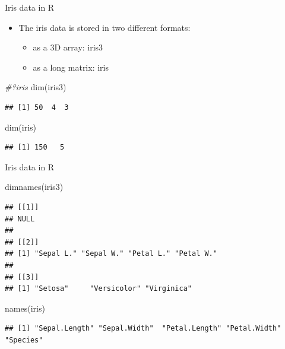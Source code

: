 \documentclass[
  ignorenonframetext,
]{beamer}
\newenvironment{Shaded}{\begin{snugshade}}{\end{snugshade}}
\newcommand{\CommentTok}[1]{\textcolor[rgb]{0.56,0.35,0.01}{\textit{#1}}}
\newcommand{\FunctionTok}[1]{\textcolor[rgb]{0.00,0.00,0.00}{#1}}
\newcommand{\NormalTok}[1]{#1}
\providecommand{\tightlist}{%
  \setlength{\itemsep}{0pt}\setlength{\parskip}{0pt}}
\begin{document}
\begin{frame}[fragile]{Iris data in R}
\protect\hypertarget{iris-data-in-r}{}
\begin{itemize}
\tightlist
\item
  The iris data is stored in two different formats:

  \begin{itemize}
  \tightlist
  \item
    as a 3D array: iris3
  \item
    as a long matrix: iris
  \end{itemize}
\end{itemize}

\begin{Shaded}
\begin{Highlighting}[]
\CommentTok{\#?iris}
\FunctionTok{dim}\NormalTok{(iris3)}
\end{Highlighting}
\end{Shaded}

\begin{verbatim}
## [1] 50  4  3
\end{verbatim}

\begin{Shaded}
\begin{Highlighting}[]
\FunctionTok{dim}\NormalTok{(iris)}
\end{Highlighting}
\end{Shaded}

\begin{verbatim}
## [1] 150   5
\end{verbatim}
\end{frame}

\begin{frame}[fragile]{Iris data in R}
\protect\hypertarget{iris-data-in-r-1}{}
\begin{Shaded}
\begin{Highlighting}[]
\FunctionTok{dimnames}\NormalTok{(iris3)}
\end{Highlighting}
\end{Shaded}

\begin{verbatim}
## [[1]]
## NULL
## 
## [[2]]
## [1] "Sepal L." "Sepal W." "Petal L." "Petal W."
## 
## [[3]]
## [1] "Setosa"     "Versicolor" "Virginica"
\end{verbatim}

\begin{Shaded}
\begin{Highlighting}[]
\FunctionTok{names}\NormalTok{(iris)}
\end{Highlighting}
\end{Shaded}

\begin{verbatim}
## [1] "Sepal.Length" "Sepal.Width"  "Petal.Length" "Petal.Width"  "Species"
\end{verbatim}
\end{frame}
\end{document}
